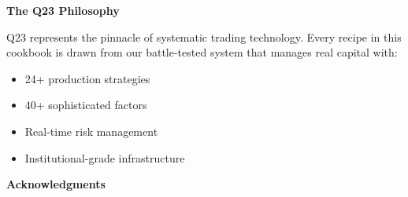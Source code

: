 \documentclass[11pt,letterpaper,openany]{book}
\begin{document}
\textbf{The Q23 Philosophy}

Q23 represents the pinnacle of systematic trading technology. Every recipe in this cookbook is drawn from our battle-tested system that manages real capital with:

\begin{itemize}
    \item 24+ production strategies
    \item 40+ sophisticated factors
    \item Real-time risk management
    \item Institutional-grade infrastructure
\end{itemize}

\textbf{Acknowledgments}
\end{document}
